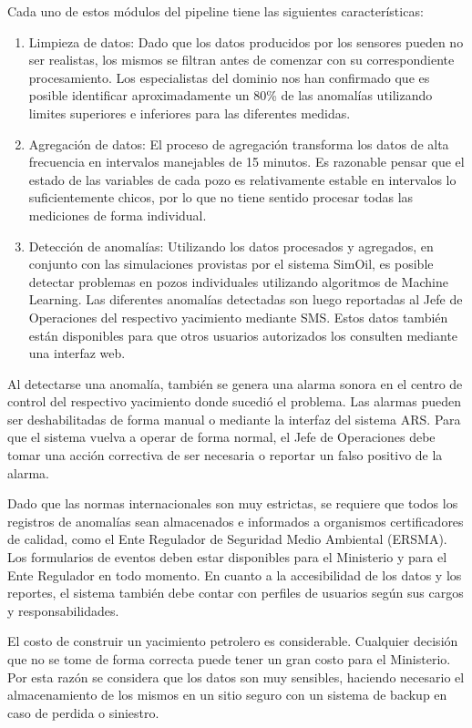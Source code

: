 \documentclass{article}
\theoremstyle{definition}
\theoremstyle{remark}
\begin{document}
Cada uno de estos módulos del pipeline tiene las siguientes características:
\begin{enumerate}
  \item Limpieza de datos: Dado que los datos producidos por los sensores pueden no ser realistas, los mismos se filtran antes de comenzar con su correspondiente procesamiento. Los especialistas del dominio nos han confirmado que es posible identificar aproximadamente un 80\% de las anomalías utilizando limites superiores e inferiores para las diferentes medidas.
  \item Agregación de datos: El proceso de agregación transforma los datos de alta frecuencia en intervalos manejables de 15 minutos. Es razonable pensar que el estado de las variables de cada pozo es relativamente estable en intervalos lo suficientemente chicos, por lo que no tiene sentido procesar todas las mediciones de forma individual.
  \item Detección de anomalías: Utilizando los datos procesados y agregados, en conjunto con las simulaciones provistas por el sistema SimOil, es posible detectar problemas en pozos individuales utilizando algoritmos de Machine Learning. Las diferentes anomalías detectadas son luego reportadas al Jefe de Operaciones del respectivo yacimiento mediante SMS. Estos datos también están disponibles para que otros usuarios autorizados los consulten mediante una interfaz web.
\end{enumerate}

Al detectarse una anomalía, también se genera una alarma sonora en el centro de control del respectivo yacimiento donde sucedió el problema. Las alarmas pueden ser deshabilitadas de forma manual o mediante la interfaz del sistema ARS. Para que el sistema vuelva a operar de forma normal, el Jefe de Operaciones debe tomar una acción correctiva de ser necesaria o reportar un falso positivo de la alarma.

Dado que las normas internacionales son muy estrictas, se requiere que todos los registros de anomalías sean almacenados e informados a organismos certificadores de calidad, como el Ente Regulador de Seguridad Medio Ambiental (ERSMA). Los formularios de eventos deben estar disponibles para el Ministerio y para el Ente Regulador en todo momento. En cuanto a la accesibilidad de los datos y los reportes, el sistema también debe contar con perfiles de usuarios según sus cargos y responsabilidades.

El costo de construir un yacimiento petrolero es considerable. Cualquier decisión que no se tome de forma correcta puede tener un gran costo para el Ministerio. Por esta razón se considera que los datos son muy sensibles, haciendo necesario el almacenamiento de los mismos en un sitio seguro con un sistema de backup en caso de perdida o siniestro.
\end{document}
